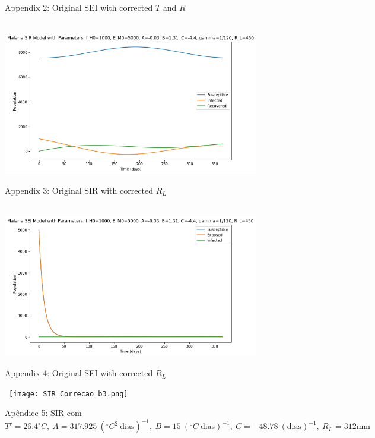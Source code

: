 \documentclass[
	12pt,				%
	oneside,			%
	a4paper,			%
	english,			%
	brazil				%
	]{abntex2}
\begin{document}
\begin{apendicesenv}
\begin{figure}[!ht]
	\caption*{Appendix 2: Original SEI with corrected $T$ and $R$}
\end{figure} 
\newpage
\begin{figure}[!ht]
	\centering
	\hbox{\hspace{3.5em} \includegraphics[scale=0.55] {THESIS-SIR_RL_adaptado.png}}
	\caption*{Appendix 3: Original SIR with corrected $R_L$}
\end{figure} 
\begin{figure}[!ht]
	\centering
	\hbox{\hspace{3.5em} \includegraphics[scale=0.55] {THESIS-SEI_RL_adaptado.png}}
	\caption*{Appendix 4: Original SEI with corrected $R_L$}
\end{figure}
\newpage
\begin{figure}[!ht]
	\centering
	\hbox{\hspace{2.0em} \texttt{[image: SIR\_Correcao\_b3.png]}}
	\caption*{Apêndice 5: SIR com $T'=26.4^\circ C, \ A=317.925 \ (^\circ C^2 \ \text{dias})^{-1}, \ B=15 \ (^\circ C \ \text{dias})^{-1}, \ C=-48.78 \ (\text{dias})^{-1}, \ R_L=312 \text{mm}$}
\end{figure} 
\begin{figure}[!ht]

\end{figure}
\end{apendicesenv}
\end{document}
